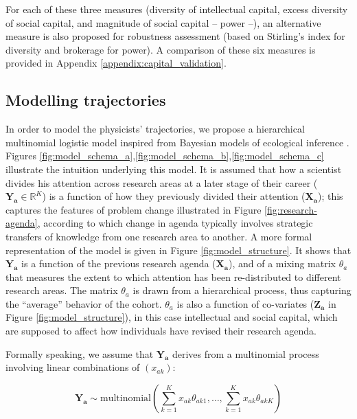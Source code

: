 \documentclass{article}
\begin{document}
For each of these three measures (diversity of intellectual capital, excess diversity of social capital, and magnitude of social capital -- power --), an alternative measure is also proposed for robustness assessment (based on Stirling's index for diversity and brokerage for power). A comparison of these six measures is provided in Appendix \ref{appendix:capital_validation}. 

\subsection{\label{sec:model}Modelling trajectories}

In order to model the physicists' trajectories, we propose a hierarchical multinomial logistic model inspired from Bayesian models of ecological inference \citep{RosJiaKin01}. Figures \ref{fig:model_schema_a},\ref{fig:model_schema_b},\ref{fig:model_schema_c} illustrate the intuition underlying this model. It is assumed that how a scientist divides his attention across research areas at a later stage of their career ($\bm{Y_{a}} \in \mathbb{R}^K$) is a function of how they previously divided their attention ($\bm{X_{a}}$); this captures the features of problem change illustrated in Figure \ref{fig:research-agenda}, according to which change in agenda typically involves strategic transfers of knowledge from one research area to another. A more formal representation of the model is given in Figure \ref{fig:model_structure}. It shows that $\bm{Y_{a}}$ is a function of the previous research agenda ($\bm{X_{a}}$), and of a mixing matrix $\theta_a$ that measures the extent to which attention has been re-distributed to different research areas. The matrix $\theta_a$ is drawn from a hierarchical process, thus capturing the ``average'' behavior of the cohort. $\theta_a$ is also a function of co-variates ($\bm{Z_a}$ in Figure \ref{fig:model_structure}), in this case intellectual and social capital, which are supposed to affect how individuals have revised their research agenda. %

Formally speaking, we assume that $\bm{Y_{a}}$ derives from a multinomial process involving linear combinations of $(x_{ak})$:

\begin{equation}
    \bm{Y_a} \sim \text{multinomial}(\sum_{k=1}^{K} x_{ak}\theta_{ak1} ,\dots,\sum_{k=1}^{K}x_{ak}\theta_{akK})
\end{equation}
\end{document}
